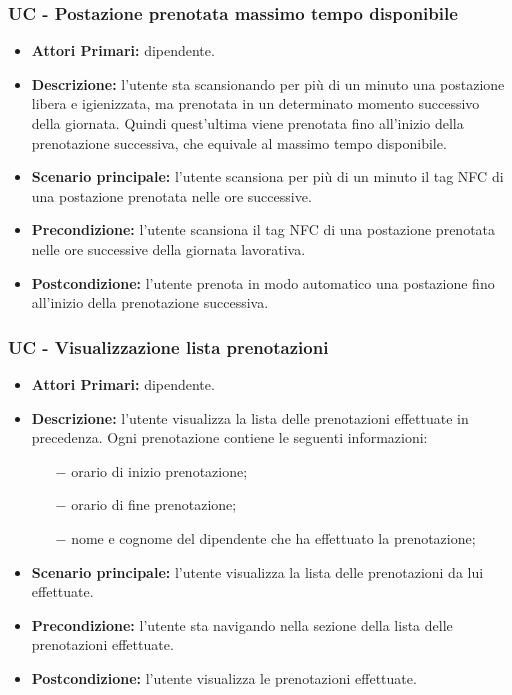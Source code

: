 \subsubsection{ UC - Postazione prenotata massimo tempo disponibile}
\begin{itemize}
	\item\textbf{Attori Primari:} dipendente.
	\item\textbf{Descrizione:} l'utente sta scansionando per più di un minuto una postazione libera e igienizzata, ma prenotata in un determinato momento successivo della giornata. Quindi quest'ultima viene prenotata fino all'inizio della prenotazione successiva, che equivale al massimo tempo disponibile.
	\item\textbf{Scenario principale:} l'utente scansiona per più di un minuto il tag NFC di una postazione prenotata nelle ore successive.
	\item\textbf{Precondizione:} l'utente scansiona il tag NFC di una postazione prenotata nelle ore successive della giornata lavorativa.
	\item\textbf{Postcondizione:} l'utente prenota in modo automatico una postazione fino all'inizio della prenotazione successiva.
\end{itemize}

\subsubsection{ UC - Visualizzazione lista prenotazioni}
\begin{itemize}
	\item\textbf{Attori Primari:} dipendente.
	\item\textbf{Descrizione:} l'utente visualizza la lista delle prenotazioni effettuate in precedenza. Ogni prenotazione contiene le seguenti informazioni:
	\begin{itemize}
		\item[$-$] orario di inizio prenotazione;
		\item[$-$] orario di fine prenotazione;
		\item[$-$] nome e cognome del dipendente che ha effettuato la prenotazione;
	\end{itemize}
	\item\textbf{Scenario principale:} l’utente visualizza la lista delle prenotazioni da lui effettuate.
	\item\textbf{Precondizione:} l'utente sta navigando nella sezione della lista delle prenotazioni effettuate.
	\item\textbf{Postcondizione:} l’utente visualizza le prenotazioni effettuate.
\end{itemize}

